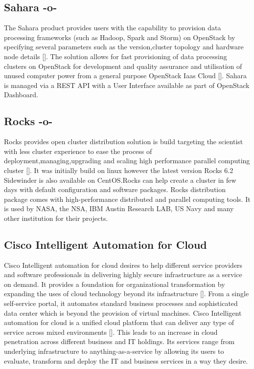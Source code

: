 \subsection{Sahara -o-}

The Sahara product provides users with the capability to provision
data processing frameworks (such as Hadoop, Spark and Storm) on
OpenStack by specifying several parameters such as the version,cluster
topology and hardware node details [\cite{www-openStack}]. The solution
allows for fast provisioning of data processing clusters on OpenStack
for development and quality assurance and utilisation of unused
computer power from a general purpose OpenStack Iaas
Cloud [\cite{www-Sahara}].  Sahara is managed via a REST API with a User
Interface available as part of OpenStack Dashboard.



\subsection{Rocks -o-}

Rocks provides open cluster distribution solution is build targeting
the scientist with less cluster experience to ease the process of
deployment,managing,upgrading and scaling high performance parallel
computing cluster [\cite{www-rockscluster}].  It was initially build on
linux however the latest version Rocks 6.2 Sidewinder is also
available on CentOS.Rocks can help create a cluster in few days with
default configuration and software packages.  Rocks distribution
package comes with high-performance distributed and parallel computing
tools. It is used by NASA, the NSA, IBM Austin Research LAB, US Navy
and many other institution for their projects.



\subsection{Cisco Intelligent Automation for Cloud}

Cisco Intelligent automation for cloud desires to help different
service providers and software professionals in delivering highly
secure infrastructure as a service on demand. It provides a foundation
for organizational transformation by expanding the uses of cloud
technology beyond its infrastructure [\cite{cis1}]. From a single
self-service portal, it automates standard business processes and
sophisticated data center which is beyond the provision of virtual
machines. Cisco Intelligent automation for cloud is a unified cloud
platform that can deliver any type of service across mixed
environments [\cite{cis2}]. This leads to an increase in cloud
penetration across different business and IT holdings. Its services
range from underlying infrastructure to anything-as-a-service by
allowing its users to evaluate, transform and deploy the IT and
business services in a way they desire.

